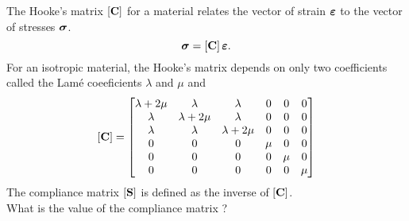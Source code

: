 \bexo
The Hooke's matrix $\left[ \textbf{C} \right]$ for 
a material relates the vector of strain $\boldsymbol{\varepsilon}$ to the vector of stresses $\boldsymbol{\sigma}$. 
\begin{equation}
	\boldsymbol{\sigma}=\left[ \textbf{C} \right]\boldsymbol{\varepsilon}.
\end{equation}
For an isotropic material, the Hooke's matrix depends on only two coefficients called the Lamé coeeficients $\lambda$ and $\mu$ and
\begin{equation}
	\left[ \textbf{C} \right]=
	\begin{bmatrix}
		\lambda+2\mu & \lambda & \lambda &0&0&0\\
		 \lambda &\lambda+2\mu & \lambda &0&0&0\\
		 \lambda &\lambda &\lambda+2\mu & 0&0&0\\
		 0&0&0&\mu &0&0\\
		 0&0&0&0&\mu &0\\
		 0&0&0&0&0&\mu  
	\end{bmatrix}
\end{equation}
The compliance matrix $\left[ \textbf{S} \right]$ is defined as the inverse of $\left[ \textbf{C} \right]$. \\

What is the value of the compliance matrix ?


\eexo 

\solution{}
	




